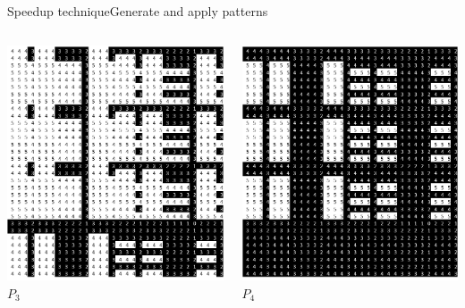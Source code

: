 \documentclass[pdf,xcolor={dvipsnames}]{beamer}
\begin{document}
\begin{frame}{Speedup technique}{Generate and apply patterns}
\begin{enumerate}
\begin{columns}
			\begin{column}{0.12\textwidth}\includegraphics[width=\textwidth]{img/3}\\ \centering $P_3$ \end{column}
			\begin{column}{0.12\textwidth}\includegraphics[width=\textwidth]{img/4}\\ \centering $P_4$ \end{column}

\end{columns}
\end{enumerate}
\end{frame}
\end{document}

